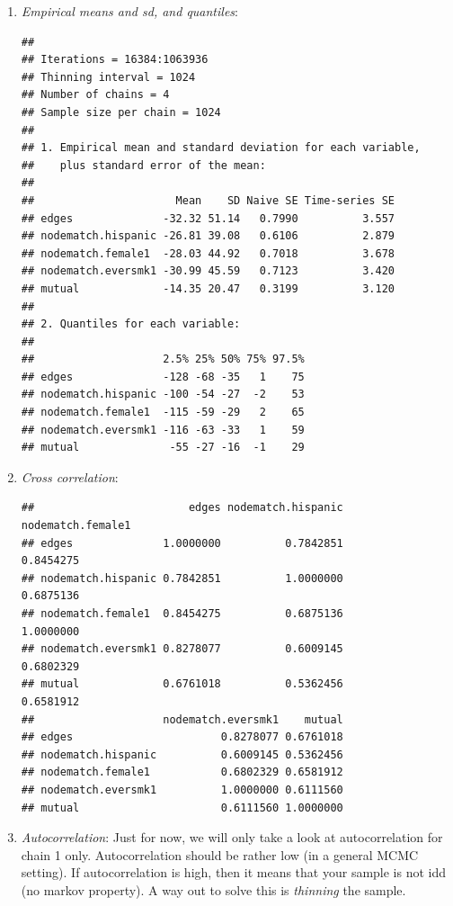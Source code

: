 \documentclass[]{book}
\newenvironment{Shaded}{\begin{snugshade}}{\end{snugshade}}
\newcommand{\KeywordTok}[1]{\textcolor[rgb]{0.13,0.29,0.53}{\textbf{#1}}}
\newcommand{\OperatorTok}[1]{\textcolor[rgb]{0.81,0.36,0.00}{\textbf{#1}}}
\newcommand{\NormalTok}[1]{#1}
\theoremstyle{definition}
\theoremstyle{definition}
\theoremstyle{definition}
\theoremstyle{remark}
\begin{document}
\begin{enumerate}
\def\labelenumi{\arabic{enumi}.}
\item
  \emph{Empirical means and sd, and quantiles}:

\begin{Shaded}
\end{Shaded}

\begin{verbatim}
## 
## Iterations = 16384:1063936
## Thinning interval = 1024 
## Number of chains = 4 
## Sample size per chain = 1024 
## 
## 1. Empirical mean and standard deviation for each variable,
##    plus standard error of the mean:
## 
##                      Mean    SD Naive SE Time-series SE
## edges              -32.32 51.14   0.7990          3.557
## nodematch.hispanic -26.81 39.08   0.6106          2.879
## nodematch.female1  -28.03 44.92   0.7018          3.678
## nodematch.eversmk1 -30.99 45.59   0.7123          3.420
## mutual             -14.35 20.47   0.3199          3.120
## 
## 2. Quantiles for each variable:
## 
##                    2.5% 25% 50% 75% 97.5%
## edges              -128 -68 -35   1    75
## nodematch.hispanic -100 -54 -27  -2    53
## nodematch.female1  -115 -59 -29   2    65
## nodematch.eversmk1 -116 -63 -33   1    59
## mutual              -55 -27 -16  -1    29
\end{verbatim}
\item
  \emph{Cross correlation}:

\begin{Shaded}
\end{Shaded}

\begin{verbatim}
##                        edges nodematch.hispanic nodematch.female1
## edges              1.0000000          0.7842851         0.8454275
## nodematch.hispanic 0.7842851          1.0000000         0.6875136
## nodematch.female1  0.8454275          0.6875136         1.0000000
## nodematch.eversmk1 0.8278077          0.6009145         0.6802329
## mutual             0.6761018          0.5362456         0.6581912
##                    nodematch.eversmk1    mutual
## edges                       0.8278077 0.6761018
## nodematch.hispanic          0.6009145 0.5362456
## nodematch.female1           0.6802329 0.6581912
## nodematch.eversmk1          1.0000000 0.6111560
## mutual                      0.6111560 1.0000000
\end{verbatim}
\item
  \emph{Autocorrelation}: Just for now, we will only take a look at
  autocorrelation for chain 1 only. Autocorrelation should be rather low
  (in a general MCMC setting). If autocorrelation is high, then it means
  that your sample is not idd (no markov property). A way out to solve
  this is \emph{thinning} the sample.


\end{enumerate}
\end{document}
